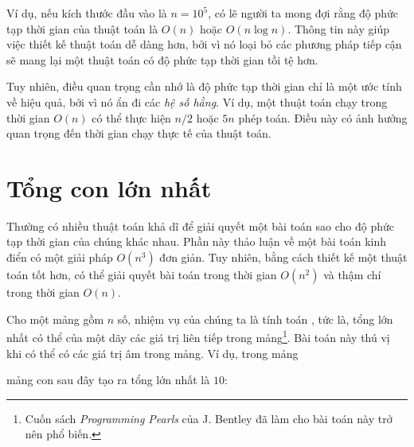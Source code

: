 Ví dụ, nếu kích thước đầu vào là $n=10^5$,
có lẽ người ta mong đợi rằng độ phức tạp
thời gian của thuật toán là $O(n)$ hoặc $O(n \log n)$.
Thông tin này giúp việc thiết kế thuật toán dễ dàng hơn,
bởi vì nó loại bỏ các phương pháp tiếp cận sẽ mang lại
một thuật toán có độ phức tạp thời gian tồi tệ hơn.


Tuy nhiên, điều quan trọng cần nhớ là
độ phức tạp thời gian chỉ là một ước tính về hiệu quả,
bởi vì nó ẩn đi các \emph{hệ số hằng}.
Ví dụ, một thuật toán chạy trong thời gian $O(n)$
có thể thực hiện $n/2$ hoặc $5n$ phép toán.
Điều này có ảnh hưởng quan trọng đến thời gian
chạy thực tế của thuật toán.

\section{Tổng con lớn nhất}


Thường có nhiều thuật toán khả dĩ
để giải quyết một bài toán sao cho
độ phức tạp thời gian của chúng khác nhau.
Phần này thảo luận về một bài toán kinh điển
có một giải pháp $O(n^3)$ đơn giản.
Tuy nhiên, bằng cách thiết kế một thuật toán tốt hơn,
có thể giải quyết bài toán trong thời gian $O(n^2)$
và thậm chí trong thời gian $O(n)$.

Cho một mảng gồm $n$ số,
nhiệm vụ của chúng ta là tính toán
, tức là,
tổng lớn nhất có thể của
một dãy các giá trị liên tiếp
trong mảng\footnote{Cuốn sách
\emph{Programming Pearls} của J. Bentley \cite{ben86} đã làm cho bài toán này trở nên phổ biến.}.
Bài toán này thú vị khi có thể có
các giá trị âm trong mảng.
Ví dụ, trong mảng
\begin{center}
\end{center}
\begin{samepage}
mảng con sau đây tạo ra tổng lớn nhất là $10$:
\begin{center}
\end{center}
\end{samepage}


